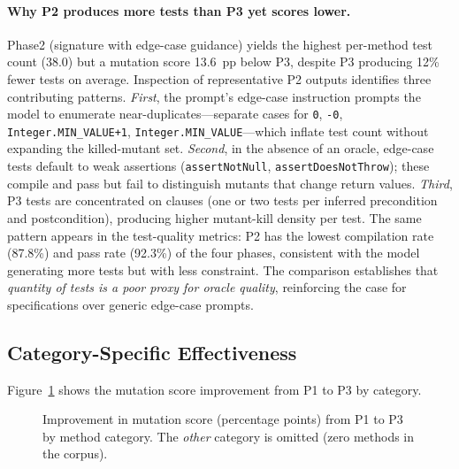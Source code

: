 \documentclass[11pt]{article}
\providecommand{\DIFaddtex}[1]{{\protect\color{blue}\uwave{#1}}} %
\providecommand{\DIFaddbegin}{} %
\providecommand{\DIFaddend}{} %
\providecommand{\DIFadd}[1]{\texorpdfstring{\DIFaddtex{#1}}{#1}} %
\providecommand{\DIFaddincludegraphics}[2][]{{\color{blue}\fbox{\DIFOincludegraphics[#1]{#2}}}} %
\DeclareRobustCommand{\DIFaddbegin}{\DIFOaddbegin \let\includegraphics\DIFaddincludegraphics} %
\DeclareRobustCommand{\DIFaddend}{\DIFOaddend \let\includegraphics\DIFOincludegraphics} %
\begin{document}
\paragraph{Why P2 produces more tests than P3 yet scores lower.}
Phase\DIFaddbegin \DIFadd{~}\DIFaddend 2 (signature with edge-case guidance) yields the highest per-method test count (38.0) but a mutation score 13.6~pp below P3, despite P3 producing 12\% fewer tests on average. Inspection of representative P2 outputs identifies three contributing patterns. \emph{First}, the prompt's edge-case instruction prompts the model to enumerate near-duplicates---separate cases for \texttt{0}, \texttt{-0}, \texttt{Integer.MIN\_VALUE+1}, \texttt{Integer.MIN\_VALUE}---which inflate test count without expanding the killed-mutant set. \emph{Second}, in the absence of an oracle, edge-case tests default to weak assertions (\texttt{assertNotNull}, \texttt{assertDoesNotThrow}); these compile and pass but fail to distinguish mutants that change return values. \emph{Third}, P3 tests are concentrated on clauses (one or two tests per inferred precondition and postcondition), producing higher mutant-kill density per test. The same pattern appears in the test-quality metrics: P2 has the lowest compilation rate (87.8\%) and pass rate (92.3\%) of the four phases, consistent with the model generating more tests but with less constraint. The comparison establishes that \emph{quantity of tests is a poor proxy for oracle quality}, reinforcing the case for specifications over generic edge-case prompts.

\subsection{Category-Specific Effectiveness}

Figure~\ref{fig:improvement-by-category} shows the mutation score improvement from P1 to P3 by category.

\begin{figure}[ht]
\centering
{}
\caption{Improvement in mutation score (percentage points) from P1 to P3 by method category. The \emph{other} category is omitted (zero methods in the corpus).}
\label{fig:improvement-by-category}
\end{figure}
\end{document}
